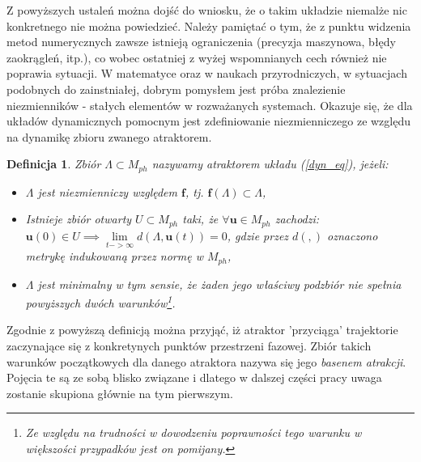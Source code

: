 \documentclass[12pt]{article}
\newtheorem{defi}{Definicja}
\begin{document}
Z powyższych ustaleń można dojść do wniosku, że o takim układzie niemalże nic konkretnego nie można powiedzieć. Należy pamiętać o tym, że z punktu widzenia metod numerycznych zawsze istnieją ograniczenia (precyzja maszynowa, błędy zaokrągleń, itp.), co wobec ostatniej z wyżej wspomnianych cech również nie poprawia sytuacji. W matematyce oraz w naukach przyrodniczych, w sytuacjach podobnych do zainstniałej, dobrym pomysłem jest próba znalezienie niezmienników - stałych elementów w rozważanych systemach. Okazuje się, że dla układów dynamicznych pomocnym jest zdefiniowanie niezmienniczego ze względu na dynamikę zbioru zwanego atraktorem.
\begin{defi}
	Zbiór $\Lambda \subset M_{ph}$ nazywamy atraktorem układu (\ref{dyn_eq}), jeżeli:
	\begin{itemize}
		\item $\Lambda $ jest niezmienniczy względem $ \textbf{f} $, tj. $ \textbf{f}(\Lambda) \subset \Lambda $,
		\item Istnieje zbiór otwarty $ U \subset M_{ph} $ taki, że
		$\forall \textbf{u} \in M_{ph}$ zachodzi: \newline
		$ \textbf{u}(0) \in U  \implies \lim\limits_{t->\infty} d(\Lambda, \textbf{u}(t))=0$, \newline gdzie przez $ d(,) $ oznaczono metrykę indukowaną przez normę w $ M_{ph} $,
		\item $\Lambda$ jest minimalny w tym sensie, że żaden jego właściwy podzbiór nie spełnia powyższych dwóch warunków\footnote{Ze względu na trudności w dowodzeniu poprawności tego warunku w większości przypadków jest on pomijany.}.
	\end{itemize}  
\end{defi}
Zgodnie z powyższą definicją można przyjąć, iż atraktor 'przyciąga' trajektorie zaczynające się z konkretynych punktów przestrzeni fazowej. Zbiór takich warunków początkowych dla danego atraktora nazywa się jego \textit{basenem atrakcji}. Pojęcia te są ze sobą blisko związane i dlatego w dalszej części pracy uwaga zostanie skupiona głównie na tym pierwszym. \newline
\end{document}
